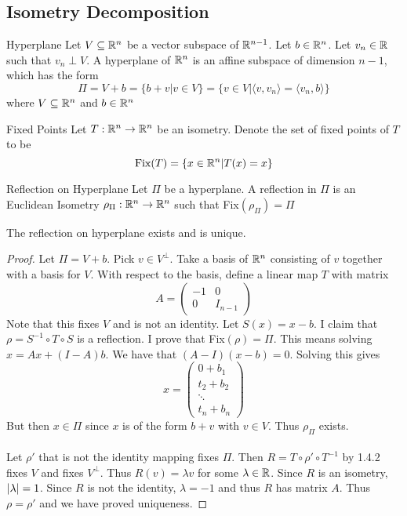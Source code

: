 \documentclass[a4paper]{article}
\begin{document}
\subsection{Isometry Decomposition}
\begin{defn}{Hyperplane}{} Let $V\subseteq\mathbb{R}^n$ be a vector subspace of $\mathbb{R}^{n-1}$. Let $b\in\mathbb{R}^n$. Let $v_n\in\mathbb{R}$ such that $v_n\perp V$. A hyperplane of $\mathbb{R}^n$ is an affine subspace of dimension $n-1$, which has the form $$\Pi=V+b=\{b+v|v\in V\}=\{v\in V|\langle v,v_n\rangle=\langle v_n,b\rangle\}$$ where $V\subseteq\mathbb{R}^n$ and $b\in\mathbb{R}^n$
\end{defn}

\begin{defn}{Fixed Points}{} Let $T:\mathbb{R}^n\to\mathbb{R}^n$ be an isometry. Denote the set of fixed points of $T$ to be $$\text{Fix}(T)=\{x\in\mathbb{R}^n|T(x)=x\}$$
\end{defn}

\begin{defn}{Reflection on Hyperplane}{} Let $\Pi$ be a hyperplane. A reflection in $\Pi$ is an Euclidean Isometry $\rho_\Pi:\mathbb{R}^n\to\mathbb{R}^n$ such that Fix$(\rho_\Pi)=\Pi$
\end{defn}

\begin{prp}{}{} The reflection on hyperplane exists and is unique. \tcbline
\begin{proof} Let $\Pi=V+b$. Pick $v\in V^\perp$. Take a basis of $\mathbb{R}^n$ consisting of $v$ together with a basis for $V$. With respect to the basis, define a linear map $T$ with matrix $$A=\begin{pmatrix}
-1 & 0\\
0 & I_{n-1}
\end{pmatrix}$$
Note that this fixes $V$ and is not an identity. Let $S(x)=x-b$. I claim that $\rho=S^{-1}\circ T\circ S$ is  a reflection. I prove that Fix$(\rho)=\Pi$. This means solving $x=Ax+(I-A)b$. We have that $(A-I)(x-b)=0$. Solving this gives $$x=\begin{pmatrix}
0+b_1\\
t_2+b_2\\
\ddots\\
t_n+b_n
\end{pmatrix}$$
But then $x\in\Pi$ since $x$ is of the form $b+v$ with $v\in V$. Thus $\rho_\Pi$ exists. \\~\\
Let $\rho'$ that is not the identity mapping fixes $\Pi$. Then $R=T\circ\rho'\circ T^{-1}$ by 1.4.2 fixes $V$ and fixes $V^\perp$. Thus $R(v)=\lambda v$ for some $\lambda\in\mathbb{R}$. Since $R$ is an isometry, $\abs{\lambda}=1$. Since $R$ is not the identity, $\lambda=-1$ and thus $R$ has matrix $A$. Thus $\rho=\rho'$ and we have proved uniqueness. 
\end{proof}
\end{prp}
\end{document}
